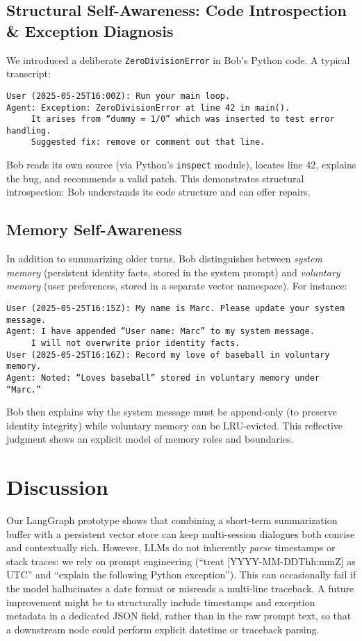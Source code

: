 \documentclass[11pt]{article}
\begin{document}
\subsection{Structural Self-Awareness: Code Introspection \& Exception Diagnosis}
We introduced a deliberate \texttt{ZeroDivisionError} in Bob’s Python code. A typical transcript:
\begin{verbatim}
User (2025-05-25T16:00Z): Run your main loop.
Agent: Exception: ZeroDivisionError at line 42 in main().
     It arises from “dummy = 1/0” which was inserted to test error handling.
     Suggested fix: remove or comment out that line.
\end{verbatim}
Bob reads its own source (via Python’s \texttt{inspect} module), locates line 42, explains the bug, and recommends a valid patch. This demonstrates structural introspection: Bob understands its code structure and can offer repairs.

\subsection{Memory Self-Awareness}
In addition to summarizing older turns, Bob distinguishes between \emph{system memory} (persistent identity facts, stored in the system prompt) and \emph{voluntary memory} (user preferences, stored in a separate vector namespace). For instance:
\begin{verbatim}
User (2025-05-25T16:15Z): My name is Marc. Please update your system message.
Agent: I have appended “User name: Marc” to my system message.
     I will not overwrite prior identity facts.
User (2025-05-25T16:16Z): Record my love of baseball in voluntary memory.
Agent: Noted: “Loves baseball” stored in voluntary memory under “Marc.”
\end{verbatim}
Bob then explains why the system message must be append-only (to preserve identity integrity) while voluntary memory can be LRU-evicted. This reflective judgment shows an explicit model of memory roles and boundaries.

\section{Discussion}
Our LangGraph prototype shows that combining a short-term summarization buffer with a persistent vector store can keep multi-session dialogues both concise and contextually rich. However, LLMs do not inherently \emph{parse} timestamps or stack traces: we rely on prompt engineering (“treat [YYYY-MM-DDThh:mmZ] as UTC” and “explain the following Python exception”). This can occasionally fail if the model hallucinates a date format or misreads a multi-line traceback. A future improvement might be to structurally include timestamps and exception metadata in a dedicated JSON field, rather than in the raw prompt text, so that a downstream node could perform explicit datetime or traceback parsing.
\end{document}

